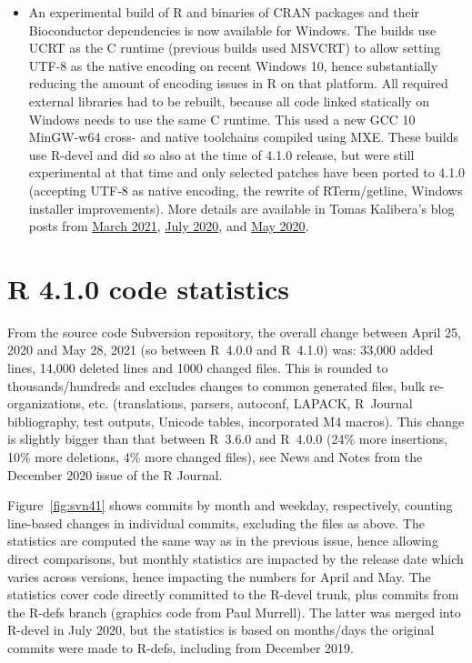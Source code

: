 \begin{itemize}
\item{} An experimental build of R and binaries of CRAN packages and their
Bioconductor dependencies is now available for Windows.  The builds use UCRT
as the C runtime (previous builds used MSVCRT) to allow setting UTF-8 as the
native encoding on recent Windows 10, hence substantially reducing the
amount of encoding issues in R on that platform.  All required external
libraries had to be rebuilt, because all code linked statically on Windows
needs to use the same C runtime.  This used a new GCC 10 MinGW-w64 cross-
and native toolchains compiled using MXE.  These builds use R-devel and did
so also at the time of 4.1.0 release, but were still experimental at that
time and only selected patches have been ported to 4.1.0 (accepting UTF-8 as
native encoding, the rewrite of RTerm/getline, Windows installer
improvements).  More details are available in Tomas Kalibera's blog posts
from
\href{https://developer.r-project.org/Blog/public/2021/03/12/windows/utf-8-toolchain-and-cran-package-checks}{March
2021},
\href{https://developer.r-project.org/Blog/public/2020/07/30/windows/utf-8-build-of-r-and-cran-packages}{July
2020}, and
\href{https://developer.r-project.org/Blog/public/2020/05/02/utf-8-support-on-windows}{May
2020}.
  
\end{itemize}

\section{R 4.1.0 code statistics}

From the source code Subversion repository, the overall change between April 25, 2020
and May 28, 2021 (so between R~4.0.0 and R~4.1.0)
was: 33,000 added lines, 14,000 deleted lines and 1000 changed files.  This
is rounded to thousands/hundreds and excludes changes to common generated
files, bulk re-organizations, etc.  (translations, parsers, autoconf,
LAPACK, R~Journal bibliography, test outputs, Unicode tables, incorporated
M4 macros).  This change is slightly bigger than that between R~3.6.0 and
R~4.0.0 (24\% more insertions, 10\% more deletions, 4\% more changed files),
see News and Notes from the December 2020 issue of the R Journal.

Figure~\ref{fig:svn41} shows commits by month and weekday, respectively,
counting line-based changes in individual commits, excluding the files as
above.  The statistics are computed the same way as in the previous issue,
hence allowing direct comparisons, but monthly statistics are impacted by
the release date which varies across versions, hence impacting the numbers
for April and May.  The statistics cover code directly committed to the
R-devel trunk, plus commits from the R-defs branch (graphics code from Paul
Murrell).  The latter was merged into R-devel in July 2020, but the
statistics is based on months/days the original commits were made to R-defs,
including from December 2019.

